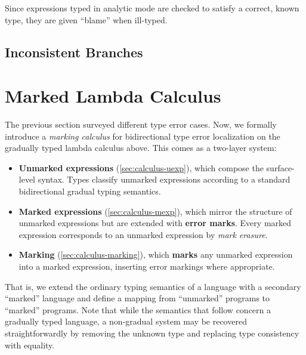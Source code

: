 


Since expressions typed in analytic mode are checked to satisfy a correct, known type, they are
given ``blame'' when ill-typed.

\subsection{Inconsistent Branches}

\section{Marked Lambda Calculus}
\label{sec:calculus}

The previous section surveyed different type error cases. Now, we formally introduce a \emph{marking
calculus} for bidirectional type error localization on the gradually typed lambda calculus above.
This comes as a two-layer system:
%
\begin{itemize}
  \item \textbf{Unmarked expressions} (\cref{sec:calculus-uexp}), which compose the surface-level
    syntax. Types classify unmarked expressions according to a standard bidirectional gradual typing
    semantics.

  \item \textbf{Marked expressions} (\cref{sec:calculus-mexp}), which mirror the structure of
    unmarked expressions but are extended with \textbf{error marks}. Every marked expression
    corresponds to an unmarked expression by \emph{mark erasure}.

  \item \textbf{Marking} (\cref{sec:calculus-marking}), which \textbf{marks} any unmarked expression into a marked
    expression, inserting error markings where appropriate.
\end{itemize}
%
That is, we extend the ordinary typing semantics of a language with a secondary ``marked'' language
and define a mapping from ``unmarked'' programs to ``marked'' programs. Note that while the
semantics that follow concern a gradually typed language, a non-gradual system may be recovered
straightforwardly by removing the unknown type and replacing type consistency with equality.

